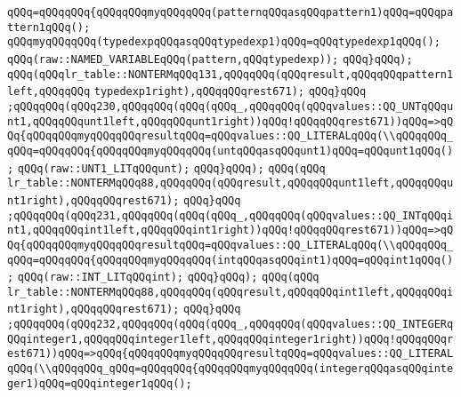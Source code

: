 \verb|qQQq=qQQqqQQq{qQQqqQQqmyqQQqqQQq(patternqQQqasqQQqpattern1)qQQq=qQQqpattern1qQQq();|\newline
\verb|qQQqmyqQQqqQQq(typedexpqQQqasqQQqtypedexp1)qQQq=qQQqtypedexp1qQQq();|\newline
\verb|qQQq(raw::NAMED_VARIABLEqQQq(pattern,qQQqtypedexp));|\newline
\verb|qQQq}qQQq);|\newline
\verb|qQQq(qQQqlr_table::NONTERMqQQq131,qQQqqQQq(qQQqresult,qQQqqQQqpattern1left,qQQqqQQq|\newline
\verb|typedexp1right),qQQqqQQqrest671);|\newline
\verb|qQQq}qQQq|\newline
\verb|;qQQqqQQq(qQQq230,qQQqqQQq(qQQq(qQQq_,qQQqqQQq(qQQqvalues::QQ_UNTqQQqunt1,qQQqqQQqunt1left,qQQqqQQqunt1right))qQQq!qQQqqQQqrest671))qQQq=>qQQq{qQQqqQQqmyqQQqqQQqresultqQQq=qQQqvalues::QQ_LITERALqQQq(\\qQQqqQQq_qQQq=qQQqqQQq{qQQqqQQqmyqQQqqQQq(untqQQqasqQQqunt1)qQQq=qQQqunt1qQQq();|\newline
\verb|qQQq(raw::UNT1_LITqQQqunt);|\newline
\verb|qQQq}qQQq);|\newline
\verb|qQQq(qQQq|\newline
\verb|lr_table::NONTERMqQQq88,qQQqqQQq(qQQqresult,qQQqqQQqunt1left,qQQqqQQqunt1right),qQQqqQQqrest671);|\newline
\verb|qQQq}qQQq|\newline
\verb|;qQQqqQQq(qQQq231,qQQqqQQq(qQQq(qQQq_,qQQqqQQq(qQQqvalues::QQ_INTqQQqint1,qQQqqQQqint1left,qQQqqQQqint1right))qQQq!qQQqqQQqrest671))qQQq=>qQQq{qQQqqQQqmyqQQqqQQqresultqQQq=qQQqvalues::QQ_LITERALqQQq(\\qQQqqQQq_qQQq=qQQqqQQq{qQQqqQQqmyqQQqqQQq(intqQQqasqQQqint1)qQQq=qQQqint1qQQq();|\newline
\verb|qQQq(raw::INT_LITqQQqint);|\newline
\verb|qQQq}qQQq);|\newline
\verb|qQQq(qQQq|\newline
\verb|lr_table::NONTERMqQQq88,qQQqqQQq(qQQqresult,qQQqqQQqint1left,qQQqqQQqint1right),qQQqqQQqrest671);|\newline
\verb|qQQq}qQQq|\newline
\verb|;qQQqqQQq(qQQq232,qQQqqQQq(qQQq(qQQq_,qQQqqQQq(qQQqvalues::QQ_INTEGERqQQqinteger1,qQQqqQQqinteger1left,qQQqqQQqinteger1right))qQQq!qQQqqQQqrest671))qQQq=>qQQq{qQQqqQQqmyqQQqqQQqresultqQQq=qQQqvalues::QQ_LITERALqQQq(\\qQQqqQQq_qQQq=qQQqqQQq{qQQqqQQqmyqQQqqQQq(integerqQQqasqQQqinteger1)qQQq=qQQqinteger1qQQq();|\newline
